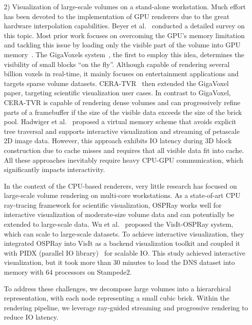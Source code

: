 2) Visualization of large-scale volumes on a stand-alone workstation.
Much effort has been devoted to the implementation of GPU renderers
due to the great hardware interpolation capabilities\cite{feng2015parallel,clyne2007interactive}.
Beyer et al.~\cite{beyer2014survey} conducted a detailed survey on this topic. Most prior work focuses on overcoming the GPU's
memory limitation and tackling this issue by loading only the visible
part of the volume into GPU memory~\cite{li2003empty}. 
The GigaVoxels system~\cite{crassin2007interactive,crassin2009gigavoxels}, the first to employ this idea, determines the visibility of
small blocks ``on the fly''.  
Although capable of rendering several billion voxels in real-time,
it mainly focuses on entertainment applications and targets sparse volume datasets.
CERA-TVR~\cite{engel2011cera} then extended the GigaVoxel paper, 
targeting scientific visualization user cases.
In contrast to GigaVoxel, CERA-TVR is capable of rendering dense volumes
and can progressively refine parts of a framebuffer if the size of the visible
data exceeds the size of the brick pool.
Hadwiger et al.~\cite{hadwiger2012interactive} proposed a virtual memory scheme
that avoids explicit tree traversal and supports interactive visualization and 
streaming of petascale 2D image data. However, this approach exhibits
IO latency during 3D block construction due to cache misses and requires that all
visible data fit into cache. All these approaches inevitably require
heavy CPU-GPU communication, which significantly impacts interactivity. 


In the context of the CPU-based renderers, very little research has focused
on large-scale volume rendering on multi-core workstations.
As a state-of-art CPU ray-tracing framework for scientific visualization,
OSPRay works well for interactive visualization of moderate-size volume data
and can potentially be extended to large-scale data.
Wu et al.~\cite{wu2018visit} proposed the VisIt-OSPRay system, which can scale to
large-scale datasets. To achieve interactive visualization, they integrated OSPRay
into VisIt as a backend visualization toolkit and coupled it with PIDX (parallel IO 
library)~\cite{kumar2011pidx} for scalable IO. 
This study achieved interactive visualization, but it took more than 30 minutes to load the DNS 
dataset into memory with 64 processors on Stampede2.

To address these challenges, we decompose large volumes into a hierarchical 
representation, with each node representing a small cubic brick. Within the rendering pipeline,
we leverage ray-guided streaming and progressive rendering to reduce IO latency.


